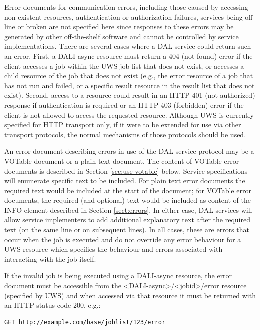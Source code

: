 \documentclass[11pt,letter]{ivoa}
\begin{document}
Error documents for communication errors, including those caused by accessing 
non-existent resources, authentication or authorization failures, services being 
off-line or broken are not specified here since responses to these errors may be 
generated by other off-the-shelf software and cannot be controlled by service 
implementations. There are several cases where a DAL service could return such 
an error. First, a DALI-async resource must return a 404 (not found) error if 
the client accesses a job within the UWS job list that does not exist, or 
accesses a child resource of the job that does not exist (e.g., the error 
resource of a job that has not run and failed, or a specific result resource in 
the result list  that does not exist). Second, access to a resource could result 
in an HTTP 401 (not authorized) response if authentication is required or an 
HTTP 403 (forbidden) error if the client is not allowed to access the requested 
resource. Although UWS is currently specified for HTTP transport only, if it 
were to be extended for use via other transport protocols, the normal mechanisms 
of those protocols should be used.

An error document describing errors in use of the DAL service protocol may be a 
VOTable document \citep{std:VOTABLE} or a plain text document. 
The content of 
VOTable error documents is described in Section \ref{sec:use-votable} below. Service 
specifications will enumerate specific text to be included. For plain text error 
documents the required text would be included at the start of the document; for 
VOTable error documents, the required (and optional) text would be included as 
content of the INFO element described in Section \ref{sect:errors}. In either case, DAL 
services will allow service implementers to add additional explanatory text 
after the required text (on the same line or on subsequent lines). In all cases, 
these are errors that occur when the job is executed and do not override any 
error behaviour for a UWS resource which specifies the behaviour and errors 
associated with interacting with the job itself.

If the invalid job is being executed using a DALI-async resource, the error 
document must be accessible from the <DALI-async>/<jobid>/error resource 
(specified by UWS) and when accessed via that resource it must be returned with 
an HTTP status code 200, e.g.:

\begin{verbatim}
GET http://example.com/base/joblist/123/error
\end{verbatim}
\end{document}
